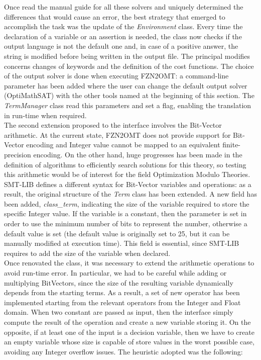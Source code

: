 Once read the manual guide for all these solvers and uniquely determined the differences that would cause an error, the best strategy that emerged to accomplish the task was the update of the \textit{Environment} class. Every time the declaration of a variable or an assertion is needed, the class now checks if the output language is not the default one and, in case of a positive answer, the string is modified before being written in the output file. The principal modifies concerns changes of keywords and the definition of the cost functions. The choice of the output solver is done when executing FZN2OMT: a command-line parameter has been added where the user can change the default output solver (OptiMathSAT) with the other tools named at the beginning of this section. The \textit{TermManager} class read this parameters and set a flag, enabling the translation in run-time when required.\\
The second extension proposed to the interface involves the Bit-Vector arithmetic. At the current state, FZN2OMT does not provide support for Bit-Vector encoding and Integer value cannot be mapped to an equivalent finite-precision encoding. On the other hand, huge progresses has been made in the definition of algorithms to efficiently search solutions for this theory, so testing this arithmetic would be of interest for the field Optimization Modulo Theories. SMT-LIB defines a different syntax for Bit-Vector variables and operations: as a result, the original structure of the \textit{Term} class has been extended. A new field has been added, \textit{class\_term}, indicating the size of the variable required to store the specific Integer value. If the variable is a constant, then the parameter is set in order to use the minimum number of bits to represent the number, otherwise a default value is set (the default value is originally set to 25, but it can be manually modified at execution time). This field is essential, since SMT-LIB requires to add the size of the variable when declared. \\
Once renovated the class, it was necessary to extend the arithmetic operations to avoid run-time error. In particular, we had to be careful while adding or multiplying BitVectors, since the size of the resulting variable dynamically depends from the starting terms. As a result, a set of new operator has been implemented starting from the relevant operators from the Integer and Float domain. When two constant are passed as input, then the interface simply compute the result of the operation and create a new variable storing it. On the opposite, if at least one of the input is a decision variable, then we have to create an empty variable whose size is capable of store values in the worst possible case, avoiding any Integer overflow issues. The heuristic adopted was the following:

